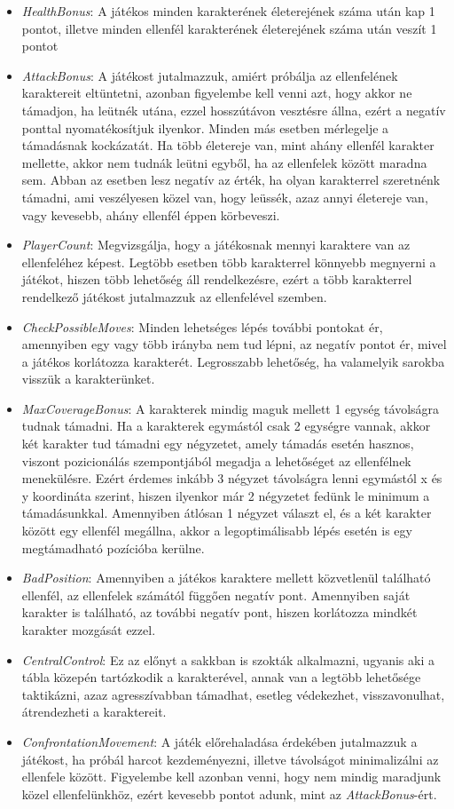 \documentclass[
]{thesis-ekf}
\theoremstyle{definition}
\theoremstyle{remark}
\begin{document}
\begin{itemize}
	\item \emph{HealthBonus}: A játékos minden karakterének életerejének száma után kap 1 pontot, illetve minden ellenfél karakterének életerejének száma után veszít 1 pontot
	\item \emph{AttackBonus}: A játékost jutalmazzuk, amiért próbálja az ellenfelének karaktereit eltüntetni, azonban figyelembe kell venni azt, hogy akkor ne támadjon, ha leütnék utána, ezzel hosszútávon vesztésre állna, ezért a negatív ponttal nyomatékosítjuk ilyenkor. Minden más esetben mérlegelje a támadásnak kockázatát. Ha több életereje van, mint ahány ellenfél karakter mellette, akkor nem tudnák leütni egyből, ha az ellenfelek között maradna sem. Abban az esetben lesz negatív az érték, ha olyan karakterrel szeretnénk támadni, ami veszélyesen közel van, hogy leüssék, azaz annyi életereje van, vagy kevesebb, ahány ellenfél éppen körbeveszi.
	\item \emph{PlayerCount}: Megvizsgálja, hogy a játékosnak mennyi karaktere van az ellenfeléhez képest. Legtöbb esetben több karakterrel könnyebb megnyerni a játékot, hiszen több lehetőség áll rendelkezésre, ezért a több karakterrel rendelkező játékost jutalmazzuk az ellenfelével szemben.
	\item \emph{CheckPossibleMoves}: Minden lehetséges lépés további pontokat ér, amennyiben egy vagy több irányba nem tud lépni, az negatív pontot ér, mivel a játékos korlátozza karakterét. Legrosszabb lehetőség, ha valamelyik sarokba visszük a karakterünket.
	\item \emph{MaxCoverageBonus}: A karakterek mindig maguk mellett 1 egység távolságra tudnak támadni. Ha a karakterek egymástól csak 2 egységre vannak, akkor két karakter tud támadni egy négyzetet, amely támadás esetén hasznos, viszont pozicionálás szempontjából megadja a lehetőséget az ellenfélnek menekülésre. Ezért érdemes inkább 3 négyzet távolságra lenni egymástól x és y koordináta szerint, hiszen ilyenkor már 2 négyzetet fedünk le minimum a támadásunkkal. Amennyiben átlósan 1 négyzet választ el, és a két karakter között egy ellenfél megállna, akkor a legoptimálisabb lépés esetén is egy megtámadható pozícióba kerülne.
	\item \emph{BadPosition}: Amennyiben a játékos karaktere mellett közvetlenül található ellenfél, az ellenfelek számától függően negatív pont. Amennyiben saját karakter is található, az további negatív pont, hiszen korlátozza mindkét karakter mozgását ezzel.
	\item \emph{CentralControl}: Ez az előnyt a sakkban is szokták alkalmazni, ugyanis aki a tábla közepén tartózkodik a karakterével, annak van a legtöbb lehetősége taktikázni, azaz agresszívabban támadhat, esetleg védekezhet, visszavonulhat, átrendezheti a karaktereit.
	\item \emph{ConfrontationMovement}: A játék előrehaladása érdekében jutalmazzuk a játékost, ha próbál harcot kezdeményezni, illetve távolságot minimalizálni az ellenfele között. Figyelembe kell azonban venni, hogy nem mindig maradjunk közel ellenfelünkhöz, ezért kevesebb pontot adunk, mint az \emph{AttackBonus}-ért.
\end{itemize}
\end{document}
